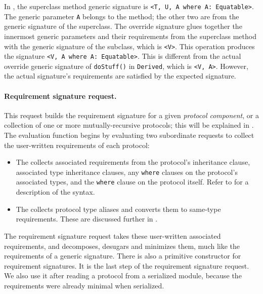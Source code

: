 \documentclass[../generics]{subfiles}
\begin{document}
\begin{example} In , the superclass method generic signature is \texttt{<T, U, A where A: Equatable>}. The generic parameter \texttt{A} belongs to the method; the other two are from the generic signature of the superclass. The override signature glues together the innermost generic parameters and their requirements from the superclass method with the generic signature of the subclass, which is \texttt{<V>}. This operation produces the signature \texttt{<V, A where A:\ Equatable>}. This is different from the actual override generic signature of \texttt{doStuff()} in \texttt{Derived}, which is \texttt{<V, A>}. However, the actual signature's requirements are satisfied by the expected signature.
\end{example}

\fi

\paragraph{Requirement signature request.} This request builds the requirement signature for a given \emph{protocol component}, or a collection of one or more mutually-recursive protocols; this will be explained in . The evaluation function begins by evaluating two subordinate requests to collect the user-written requirements of each protocol:
\begin{itemize}
\item The  collects associated requirements from the protocol’s inheritance clause, associated type inheritance clauses, any \texttt{where} clauses on the protocol’s associated types, and the \texttt{where} clause on the protocol itself. Refer to  for a description of the syntax.
\item The  collects protocol type aliases and converts them to same-type requirements. These are discussed further in .
\end{itemize}
The requirement signature request takes these user-written associated requirements, and decomposes, desugars and minimizes them, much like the requirements of a generic signature. There is also a primitive constructor for requirement signatures. It is the last step of the requirement signature request. We also use it after reading a protocol from a serialized module, because the requirements were already minimal when serialized.
\end{document}
